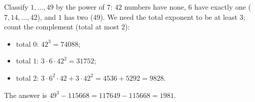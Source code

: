Classify $1,\dots,49$ by the power of $7$: $42$ numbers have none, $6$ have exactly one ($7,14,\dots,42$), and $1$ has two ($49$). We need the total exponent to be at least $3$; count the complement (total at most $2$):

\begin{itemize}
\item total $0$: $42^3=74088$;
\item total $1$: $3\cdot6\cdot42^2=31752$;
\item total $2$: $3\cdot6^2\cdot42+3\cdot42^2=4536+5292=9828$.
\end{itemize}
The answer is $49^3-115668=117649-115668=\boxed{1981}$.
